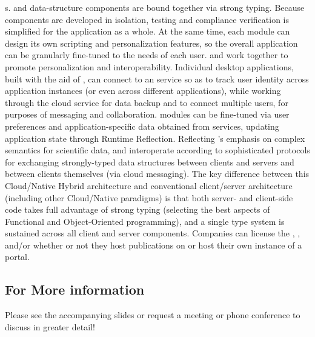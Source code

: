 \documentclass[10pt,letterpaper]{article}
\begin{document}
{\GUI}s.  {\lfGUI} and data-structure components are 
bound together via strong typing.  Because {\VersatileUX} 
components are developed in isolation, testing and 
compliance verification is simplified for the application 
as a whole.  At the same time, each {\VersatileUX} 
module can design its own scripting and personalization 
features, so the overall application can be 
granularly fine-tuned to the needs of each user.
\p{}
{\NDPCloud} and {\VersatileUX} work together to 
promote personalization and interoperability.  
Individual desktop applications, built 
with the aid of {\VersatileUX}, can connect to an 
{\NDPCloud} service so as to track user identity across 
application instances (or even across different applications), 
while working through the cloud service for data backup and 
to connect multiple users, for purposes of 
messaging and collaboration.  
{\VersatileUX} modules can be fine-tuned via 
user preferences and application-specific data obtained from 
{\NDPCloud} services, updating application state through  
Runtime Reflection.  Reflecting {\MOSAIC}'s 
emphasis on complex semantics for scientific data, 
{\NDPCloud} and {\VersatileUX} interoperate according to  
sophisticated protocols for exchanging 
strongly-typed data structures between clients and 
servers and between clients themselves (via cloud messaging).  
The key difference between this Cloud/Native Hybrid 
architecture and conventional client/server architecture 
(including other Cloud/Native paradigms) is that 
both server- and client-side code takes full advantage of 
strong typing (selecting the best aspects of 
Functional and Object-Oriented programming), 
and a single type system is 
sustained across all client and server components.
\p{}
Companies can license the {\MOSAIC} {\SDK}, {\VersatileUX}, and/or 
{\NDPCloud} whether or not they 
host publications on {\MOSAIC} or host their own instance 
of a {\MOSAIC} portal.

\subsection{For More information}
Please see the accompanying slides or request a meeting 
or phone conference to discuss {\MOSAIC} in greater detail!
\end{document}
